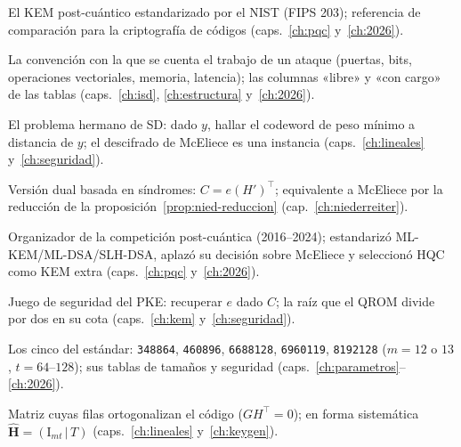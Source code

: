 \documentclass[11pt,a4paper,oneside]{report}
\newcommand{\Hmat}{\mathbf{H}}          %
\begin{document}
\begin{description}[leftmargin=2.6em,style=nextline,itemsep=2.5pt,parsep=0pt]
  \item[\textbf{ML-KEM}]
        El KEM post-cuántico estandarizado por el NIST (FIPS 203);
        referencia de comparación para la criptografía de códigos
        (caps.~\ref{ch:pqc} y~\ref{ch:2026}).

  \item[\textbf{Modelo de costes}]
        La convención con la que se cuenta el trabajo de un ataque
        (puertas, bits, operaciones vectoriales, memoria,
        latencia); las columnas «libre» y «con cargo» de las
        tablas (caps.~\ref{ch:isd}, \ref{ch:estructura}
        y~\ref{ch:2026}).

  \item[\textbf{NCP (decodificación / palabra más cercana)}]
        El problema hermano de SD: dado $y$, hallar el codeword de
        peso mínimo a distancia de $y$; el descifrado de McEliece
        es una instancia (caps.~\ref{ch:lineales}
        y~\ref{ch:seguridad}).

  \item[\textbf{Niederreiter (reformulación)}]
        Versión dual basada en síndromes: $C=e(H')^{\top}$;
        equivalente a McEliece por la reducción de la
        proposición~\ref{prop:nied-reduccion}
        (cap.~\ref{ch:niederreiter}).

  \item[\textbf{NIST}]
        Organizador de la competición post-cuántica (2016--2024);
        estandarizó ML-KEM/ML-DSA/SLH-DSA, aplazó su decisión
        sobre McEliece y seleccionó HQC como KEM extra
        (caps.~\ref{ch:pqc} y~\ref{ch:2026}).

  \item[\textbf{OW-CPA}]
        Juego de seguridad del PKE: recuperar $e$ dado $C$; la
        raíz que el QROM divide por dos en su cota
        (caps.~\ref{ch:kem} y~\ref{ch:seguridad}).

  \item[\textbf{Parámetros (conjuntos de)}]
        Los cinco del estándar: \texttt{348864}, \texttt{460896},
        \texttt{6688128}, \texttt{6960119}, \texttt{8192128}
        ($m=12$ o $13$, $t=64$--$128$); sus tablas de tamaños y
        seguridad (caps.~\ref{ch:parametros}--\ref{ch:2026}).

  \item[\textbf{Paridad (matriz de, $\Hmat$)}]
        Matriz cuyas filas ortogonalizan el código
        ($GH^{\top}=0$); en forma sistemática
        $\hat{\Hmat}=(\mathrm{I}_{mt}\,|\,T)$
        (caps.~\ref{ch:lineales} y~\ref{ch:keygen}).


\end{description}
\end{document}

